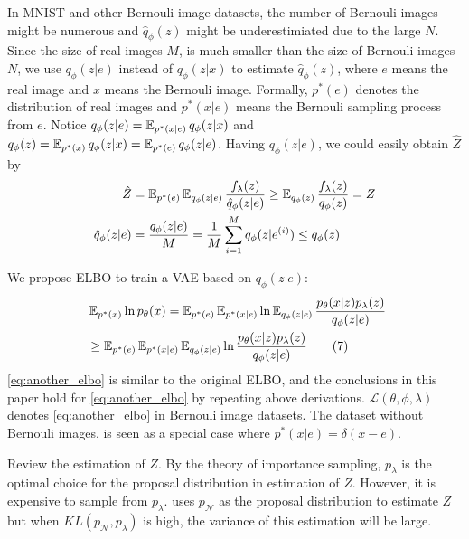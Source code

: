 In MNIST and other Bernouli image datasets, the number of Bernouli images might be numerous and $\hat{q}_\phi(z)$ might be underestimiated due to the large $N$. 
Since the size of real images $M$, is much smaller than the size of Bernouli images $N$, we use $q_\phi(z|e)$ instead of $q_\phi(z|x)$ to estimate $\hat{q}_\phi(z)$, where $e$ means the real image and $x$ means the Bernouli image. 
Formally, $p^*(e)$ denotes the distribution of real images and $p^*(x|e)$ means the Bernouli sampling process from $e$. Notice $q_\phi(z|e) = \operatorname{\mathbb{E}}_{p^*(x|e)} q_\phi(z|x)$ and $q_\phi(z) = \operatorname{\mathbb{E}}_{p^*(x)} q_\phi(z|x) = \operatorname{\mathbb{E}}_{p^*(e)} q_\phi(z|e)$. 
Having $q_\phi(z|e)$, we could easily obtain $\hat{Z}$ by 
\begin{align*}
	\hat{Z} &= \operatorname{\mathbb{E}}_{p^*(e)} \operatorname{\mathbb{E}}_{q_\phi(z|e)} \frac{f_\lambda(z)}{\hat{q}_\phi(z|e)} \geq \operatorname{\mathbb{E}}_{q_\phi(z)} \frac{f_\lambda(z)}{q_\phi(z)} = Z \\
	\hat{q}_\phi(z|e) &= \frac{q_\phi(z|e)}{M} = \frac{1}{M}\sum_{i=1}^M q_\phi(z|e^{(i)}) \leq q_\phi(z)
\end{align*}  

We propose ELBO to train a VAE based on $q_\phi(z|e)$:
\begin{align*}~\label{eq:another_elbo}
	&\E_{p^*(x)} \ln p_\theta(x) = \E_{p^*(e)} \E_{p^*(x|e)} \ln \E_{q_\phi(z|e)} \frac{p_\theta(x|z)p_\lambda(z)}{q_\phi(z|e)} \\
	 &\geq \E_{p^*(e)} \E_{p^*(x|e)} \E_{q_\phi(z|e)} \ln \frac{p_\theta(x|z)p_\lambda(z)}{q_\phi(z|e)} \tag{7} %
\end{align*} 
\cref{eq:another_elbo} is similar to the original ELBO, and the conclusions in this paper hold for \cref{eq:another_elbo} by repeating above derivations. $\mathcal{L}(\theta, \phi, \lambda)$ denotes \cref{eq:another_elbo} in Bernouli image datasets.  %
The dataset without Bernouli images, is seen as a special case where $p^*(x|e) = \delta(x - e)$. 

Review the estimation of $Z$. By the theory of importance sampling, $p_\lambda$ is the optimal choice for the proposal distribution in estimation of $Z$. However, it is expensive to sample from $p_\lambda$. 
\cite{bauer2019resampled} uses $p_\mathcal{N}$ as the proposal distribution to estimate $Z$ but when $KL(p_\mathcal{N}, p_\lambda)$ is high, the variance of this estimation will be large. 

